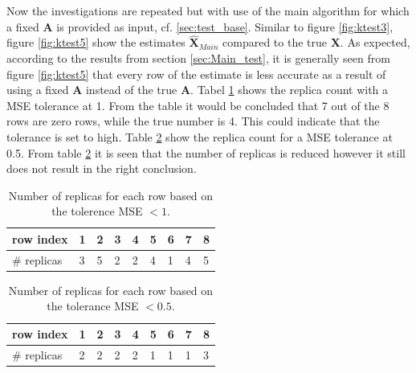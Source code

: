 Now the investigations are repeated but with use of the main algorithm for which a fixed $\textbf{A}$ is provided as input, cf. \ref{sec:test_base}.
Similar to figure \ref{fig:ktest3}, figure \ref{fig:ktest5} show the estimates $\hat{\textbf{X}}_{Main}$ compared to the true $\textbf{X}$. As expected, according to the results from section \ref{sec:Main_test}, it is generally seen from figure \ref{fig:ktest5} that every row of the estimate is less accurate as a result of using a fixed $\textbf{A}$ instead of the true $\textbf{A}$. Tabel \ref{tab:replica5} shows the replica count with a MSE tolerance at 1. From the table it would be concluded that 7 out of the 8 rows are zero rows, while the true number is 4. This could indicate that the tolerance is set to high. Table \ref{tab:replica6} show the replica count for a MSE tolerance at 0.5. From table \ref{tab:replica6} it is seen that the number of replicas is reduced however it still does not result in the right conclusion.  

\begin{table}[h]
\center
\begin{tabular}{|l|l|l|l|l|l|l|l|l|}
\hline
row index   & 1 & 2 & 3 & 4 & 5 & 6 & 7 & 8 \\ \hline
\# replicas & 3 & 5 & 2 & 2 & 4 & 1 & 4 & 5 \\ \hline
\end{tabular}
\caption{Number of replicas for each row based on the tolerence MSE $< 1$.}
\label{tab:replica5}
\end{table}

\begin{table}[h]
\center
\begin{tabular}{|l|l|l|l|l|l|l|l|l|}
\hline
row index   & 1 & 2 & 3 & 4 & 5 & 6 & 7 & 8 \\ \hline
\# replicas & 2 & 2 & 2 & 2 & 1 & 1 & 1 & 3 \\ \hline
\end{tabular}
\caption{Number of replicas for each row based on the tolerance MSE $< 0.5$.}
\label{tab:replica6}
\end{table}

